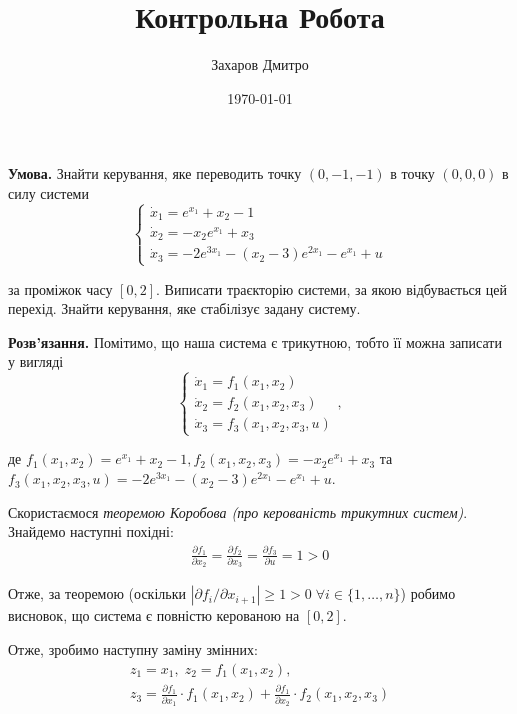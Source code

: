 \documentclass[oneside,solution]{karazin-control-assign}
\title{Контрольна Робота}
\author{Захаров Дмитро}
\date{\today}
\begin{document}
\maketitle



\hspace{20px}\textbf{Умова.} Знайти керування, яке переводить точку $(0,-1,-1)$ в точку $(0,0,0)$ в силу системи
\begin{equation}
    \begin{cases}
        \dot{x}_1 = e^{x_1} + x_2 - 1 \\
        \dot{x}_2 = -x_2e^{x_1} + x_3 \\
        \dot{x}_3 = -2e^{3x_1} - (x_2-3)e^{2x_1} - e^{x_1} + u
    \end{cases}
\end{equation}

за проміжок часу $[0,2]$. Виписати траєкторію системи, за якою відбувається цей перехід. Знайти керування, яке стабілізує задану систему.

\textbf{Розв'язання.} Помітимо, що наша система є трикутною, тобто її можна записати у вигляді
\begin{equation}
    \begin{cases}
        \dot{x}_1 = f_1(x_1,x_2) \\
        \dot{x}_2 = f_2(x_1,x_2,x_3) \\
        \dot{x}_3 = f_3(x_1,x_2,x_3,u)
    \end{cases},
\end{equation}

де $f_1(x_1,x_2)=e^{x_1}+x_2-1,f_2(x_1,x_2,x_3)=-x_2e^{x_1}+x_3$ та $f_3(x_1,x_2,x_3,u)=-2e^{3x_1}-(x_2-3)e^{2x_1} - e^{x_1} + u$. 

Скористаємося \textit{теоремою Коробова (про керованість трикутних систем)}. Знайдемо наступні похідні:
\begin{gather}
    \frac{\partial f_1}{\partial x_2} = \frac{\partial f_2}{\partial x_3} = \frac{\partial f_3}{\partial u} = 1 > 0
\end{gather}

Отже, за теоремою (оскільки $\left|\partial f_i/\partial x_{i+1}\right| \geq 1 > 0 \; \forall i \in \{1,\dots,n\}$) робимо висновок, що система є повністю керованою на $[0,2]$. 

Отже, зробимо наступну заміну змінних:
\begin{gather}
    z_1 = x_1, \; z_2 = f_1(x_1,x_2), \nonumber \\ z_3 = \frac{\partial f_1}{\partial x_1}\cdot f_1(x_1,x_2) + \frac{\partial f_1}{\partial x_2}\cdot f_2(x_1,x_2,x_3)
\end{gather}
\end{document}
